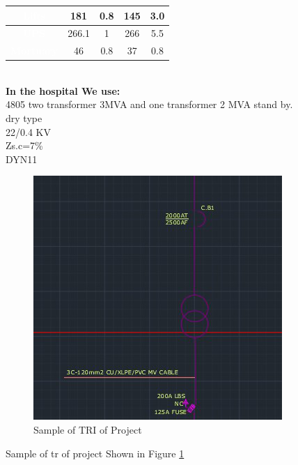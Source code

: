 \documentclass[12pt,fleqn]{book} %
\begin{document}
\begin{table}[h]
\begin{tabular}{!{\color{white}\vrule}c!{\color{black}\vrule}c!{\color{white}\vrule}c!{\color{white}\vrule}c!{\color{white}\vrule}c!{\color{white}\vrule}}
\hline
{} {}\textbf{\textcolor{white}{Lifts}}           & 181                                                   & 0.8                                                 & 145                                                   & 3.0                                  \\ 
\hline
{} {}\textbf{\textcolor{white}{UPS}}               & 266.1                                                 & 1                                                   & 266                                                   & 5.5                                  \\ 
\hline
{} {}\textbf{\textcolor{white}{Mortuary}}        & 46                                                    & 0.8                                                 & 37                                                    & 0.8                                  \\
\hline
\end{tabular}
\label{}
\end{table}
\\ \textbf{In the hospital We use:}
\\ 4805 two transformer 3MVA and one transformer 2 MVA stand by.
\\ dry type
\\ 22/0.4 KV
\\ Zs.c=7\%
\\ DYN11
     \begin{figure}[h!]
    \centering
    \includegraphics[width=0.5\linewidth]{hamdy 10.png}
    \caption{Sample of TRI of Project}
    \label{fig:hamdy 10}
\end{figure} 
Sample of tr of project Shown in Figure \ref{fig:hamdy 10}
\end{document}
